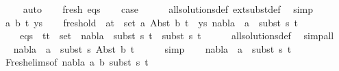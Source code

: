 \begin{isabellebody}
\ \ \ \ \isamarkupfalse%
\ auto\isanewline
\ \ \isamarkupfalse%
\ fresh\ eqs\isanewline
\ \ \isamarkupfalse%
\ {\isacharquery}{\kern0pt}case\isanewline
\ \ \ \ \isamarkupfalse%
\ all{\isacharunderscore}{\kern0pt}solutions{\isacharunderscore}{\kern0pt}def\ ext{\isacharunderscore}{\kern0pt}subst{\isacharunderscore}{\kern0pt}def\ \isamarkupfalse%
\ simp\isanewline
{}\isamarkupfalse%
\isanewline
\ \ \isamarkupfalse%
\ {\isacharparenleft}{\kern0pt}{}\ a\ b\ t\ ys{\isacharparenright}{\kern0pt}\isanewline
\ \ \isamarkupfalse%
\ fresh{\isacharunderscore}{\kern0pt}old{\isacharcolon}{\kern0pt}\ {\isachardoublequoteopen}{\isasymforall}\ {\isacharparenleft}{\kern0pt}a{\isacharcomma}{\kern0pt}t{\isacharprime}{\kern0pt}{\isacharparenright}{\kern0pt}\ {\isasymin}\ set\ {\isacharparenleft}{\kern0pt}{\isacharparenleft}{\kern0pt}a{\isacharcomma}{\kern0pt}\ Abst\ b\ t{\isacharparenright}{\kern0pt}\ {\isacharhash}{\kern0pt}\ ys{\isacharparenright}{\kern0pt}{\isachardot}{\kern0pt}\ nabla{}\ {\isasymturnstile}\ a\ {\isasymsharp}\ subst\ s{}\ t{\isacharprime}{\kern0pt}{\isachardoublequoteclose}\isanewline
\ \ \ \ \ eqs{\isacharcolon}{\kern0pt}\ {\isachardoublequoteopen}{\isasymforall}\ {\isacharparenleft}{\kern0pt}t{}{\isacharcomma}{\kern0pt}t{}{\isacharparenright}{\kern0pt}\ {\isasymin}\ set\ {\isacharbrackleft}{\kern0pt}{\isacharbrackright}{\kern0pt}{\isachardot}{\kern0pt}\ nabla{}\ {\isasymturnstile}\ subst\ s{}\ t{}\ {\isasymapprox}\ subst\ s{}\ t{}{\isachardoublequoteclose}\isanewline
\ \ \ \ \isamarkupfalse%
\ all{\isacharunderscore}{\kern0pt}solutions{\isacharunderscore}{\kern0pt}def\ \isamarkupfalse%
\ simp{\isacharunderscore}{\kern0pt}all\isanewline
\ \ \isamarkupfalse%
\ {\isachardoublequoteopen}nabla{}\ {\isasymturnstile}\ a\ {\isasymsharp}\ subst\ s{}\ {\isacharparenleft}{\kern0pt}Abst\ b\ t{\isacharparenright}{\kern0pt}{\isachardoublequoteclose}\isanewline
\ \ \ \ \isamarkupfalse%
\ simp\isanewline
\ \ \isamarkupfalse%
\ {\isachardoublequoteopen}nabla{}\ {\isasymturnstile}\ a\ {\isasymsharp}\ subst\ s{}\ t{\isachardoublequoteclose}\isanewline
\ \ \ \ \isamarkupfalse%
\ {}\ Fresh{\isacharunderscore}{\kern0pt}elims{\isacharparenleft}{\kern0pt}{}{\isacharparenright}{\kern0pt}{\isacharbrackleft}{\kern0pt}of\ nabla{}\ a\ b\ {\isacartoucheopen}subst\ s{}\ t{\isacartoucheclose}{\isacharbrackright}{\kern0pt}\ \isamarkupfalse%

\end{isabellebody}
